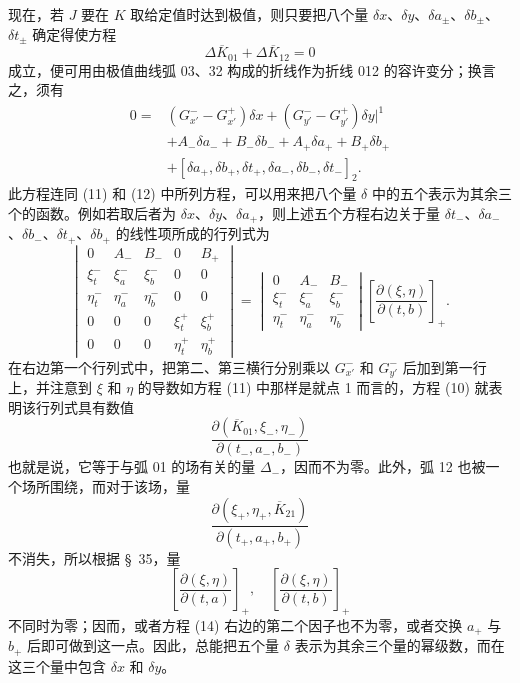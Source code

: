 \documentclass[11pt,a4paper,leqno]{article}
\begin{document}
现在，若 $J$ 要在 $K$ 取给定值时达到极值，则只要把八个量 $\delta x$、$\delta y$、$\delta a_\pm$、$\delta b_\pm$、$\delta t_\pm$ 确定得使方程
\[
\Delta\overline K_{01}+\Delta\overline K_{12}=0
\]
成立，便可用由极值曲线弧 03、32 构成的折线作为折线 012 的容许变分；换言之，须有
\begin{equation}\tag{13}
\begin{aligned}
0={}&(G_{x'}^- -G_{x'}^+)\delta x+(G_{y'}^- -G_{y'}^+)\delta y\bigg|^1 \\
&+A_-\delta a_-+B_-\delta b_-+A_+\delta a_+ +B_+\delta b_+ \\
&+[\delta a_+,\delta b_+,\delta t_+,\delta a_-,\delta b_-,\delta t_-]_2.
\end{aligned}
\end{equation}
此方程连同 (11) 和 (12) 中所列方程，可以用来把八个量 $\delta$ 中的五个表示为其余三个的函数。例如若取后者为 $\delta x$、$\delta y$、$\delta a_+$，则上述五个方程右边关于量 $\delta t_-$、$\delta a_-$、$\delta b_-$、$\delta t_+$、$\delta b_+$ 的线性项所成的行列式为
\begin{equation}\tag{14}
\begin{vmatrix}
0&A_-&B_-&0&B_+\\
\xi_t^-&\xi_a^-&\xi_b^-&0&0\\
\eta_t^-&\eta_a^-&\eta_b^-&0&0\\
0&0&0&\xi_t^+&\xi_b^+\\
0&0&0&\eta_t^+&\eta_b^+
\end{vmatrix}
=
\begin{vmatrix}
0&A_-&B_-\\
\xi_t^-&\xi_a^-&\xi_b^-\\
\eta_t^-&\eta_a^-&\eta_b^-
\end{vmatrix}
\left[\frac{\partial(\xi,\eta)}{\partial(t,b)}\right]_+ .
\end{equation}
在右边第一个行列式中，把第二、第三横行分别乘以 $G_{x'}^-$ 和 $G_{y'}^-$ 后加到第一行上，并注意到 $\xi$ 和 $\eta$ 的导数如方程 (11) 中那样是就点 1 而言的，方程 (10) 就表明该行列式具有数值
\[
\frac{\partial(\overline K_{01},\xi_-,\eta_-)}{\partial(t_-,a_-,b_-)}
\]
也就是说，它等于与弧 01 的场有关的量 $\Delta_-$，因而不为零。此外，弧 12 也被一个场所围绕，而对于该场，量
\[
\frac{\partial(\xi_+,\eta_+,\overline K_{21})}{\partial(t_+,a_+,b_+)}
\]
不消失，所以根据 \S~35，量
\[
\left[\frac{\partial(\xi,\eta)}{\partial(t,a)}\right]_+,
\quad
\left[\frac{\partial(\xi,\eta)}{\partial(t,b)}\right]_+
\]
不同时为零；因而，或者方程 (14) 右边的第二个因子也不为零，或者交换 $a_+$ 与 $b_+$ 后即可做到这一点。因此，总能把五个量 $\delta$ 表示为其余三个量的幂级数，而在这三个量中包含 $\delta x$ 和 $\delta y$。
\end{document}
